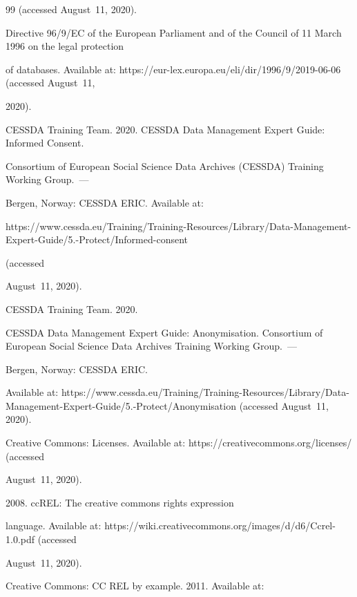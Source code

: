 {{\begin{thebibliography}{99}
(accessed August~11, 2020).


Directive 96/9/EC of the European Parliament and of the Council of 11 March 1996 on the legal protection 

of databases. Available at: {\sf https://eur-lex.\linebreak europa.eu/eli/dir/1996/9/2019-06-06} (accessed August~11, 

2020).


CESSDA Training Team. 2020. CESSDA Data Management Expert Guide: Informed Consent.

Consortium of European Social Science Data Archives (CESSDA) Training Working Group.~--- 

Bergen, Norway: CESSDA ERIC. Available at: {\sf 

https://www.cessda.eu/Training/Training-Resources/Library/Data-Management-Expert-Guide/5.-Protect/Informed-consent} (accessed 

August~11, 2020).


CESSDA Training Team. 2020.

CESSDA Data Management Expert Guide: Anonymisation. Consortium of European Social Science Data Archives Training Working Group.~--- 

Bergen, Norway: \mbox{CESSDA} ERIC.

Available at: {\sf https://www.cessda.eu/Training/Training-Resources/Library/Data-Management-Expert-Guide/5.-Protect/Anonymisation} (accessed August~11, 2020).


Creative Commons: Licenses. Available at: {\sf https://creativecommons.org/licenses/} (accessed 

August~11, 2020).


 2008. ccREL: The creative commons rights expression 

language. Available at: {\sf https://wiki.\linebreak creativecommons.org/images/d/d6/Ccrel-1.0.pdf} (accessed 

August~11, 2020).


Creative Commons: CC REL by example. 2011. Available at: {\sf  

}
\end{thebibliography}}}
